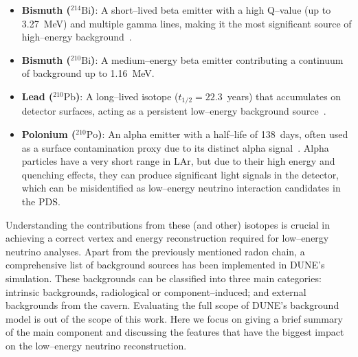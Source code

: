 \begin{itemize}
  \item \textbf{Bismuth (\(^{214}\text{Bi}\))}: A short--lived beta emitter with a high Q--value (up to \SI{3.27}{\mega\electronvolt}) and multiple gamma lines, making it the most significant source of high--energy background~\cite{pdg2024}.
  \item \textbf{Bismuth (\(^{210}\text{Bi}\))}: A medium--energy beta emitter contributing a continuum of background up to \SI{1.16}{\mega\electronvolt}.
  \item \textbf{Lead (\(^{210}\text{Pb}\))}: A long--lived isotope (\(t_{1/2} = 22.3\)~years) that accumulates on detector surfaces, acting as a persistent low--energy background source~\cite{exo_radon}.
  \item \textbf{Polonium (\(^{210}\text{Po}\))}: An alpha emitter with a half--life of 138~days, often used as a surface contamination proxy due to its distinct alpha signal~\cite{saldanha_thesis}. Alpha particles have a very short range in \ac{LAr}, but due to their high energy and quenching effects, they can produce significant light signals in the detector, which can be misidentified as low--energy neutrino interaction candidates in the \ac{PDS}.
\end{itemize}

Understanding the contributions from these (and other) isotopes is crucial in achieving a correct vertex and energy reconstruction required for low--energy neutrino analyses. Apart from the previously mentioned radon chain, a comprehensive list of background sources has been implemented in \ac{DUNE}'s simulation. These backgrounds can be classified into three main categories: intrinsic backgrounds, radiological or component--induced; and external backgrounds from the cavern. Evaluating the full scope of \ac{DUNE}'s background model is out of the scope of this work. Here we focus on giving a brief summary of the main component and discussing the features that have the biggest impact on the low--energy neutrino reconstruction.

